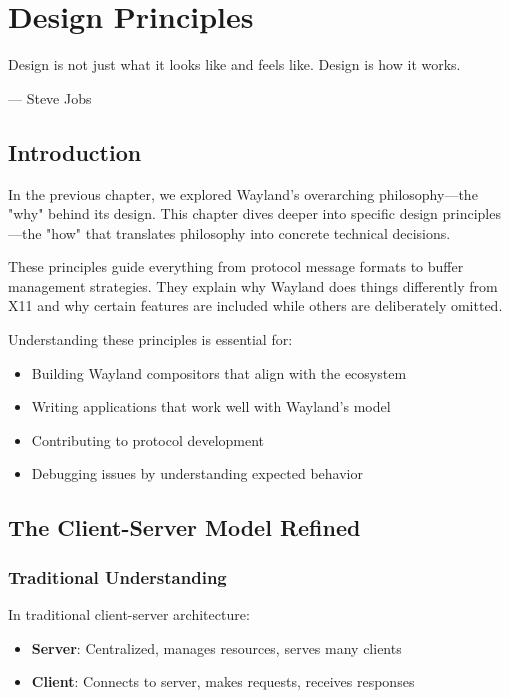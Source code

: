 \chapter{Design Principles}
\label{ch:design-principles}

\epigraph{Design is not just what it looks like and feels like. Design is how it works.}{--- Steve Jobs}

\section{Introduction}

In the previous chapter, we explored Wayland's overarching philosophy—the "why" behind its design. This chapter dives deeper into specific design principles—the "how" that translates philosophy into concrete technical decisions.

These principles guide everything from protocol message formats to buffer management strategies. They explain why Wayland does things differently from X11 and why certain features are included while others are deliberately omitted.

Understanding these principles is essential for:
\begin{itemize}
    \item Building Wayland compositors that align with the ecosystem
    \item Writing applications that work well with Wayland's model
    \item Contributing to protocol development
    \item Debugging issues by understanding expected behavior
\end{itemize}

\section{The Client-Server Model Refined}

\subsection{Traditional Understanding}

In traditional client-server architecture:
\begin{itemize}
    \item \textbf{Server}: Centralized, manages resources, serves many clients
    \item \textbf{Client}: Connects to server, makes requests, receives responses
\end{itemize}

